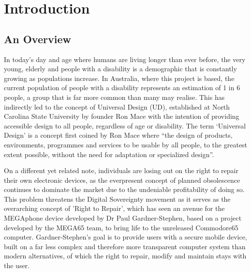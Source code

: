 
\chapter{Introduction}\label{chapter:firstchapter} %

\label{Chapter1} %


\section{An Overview}\label{sec:firstsection} %

In today's day and age where humans are living longer than ever before, the very young, elderly and people with a disability is a demographic that is constantly growing as populations increase.
In Australia, where this project is based, the current population of people with a disability represents an estimation of 1 in 6 people\cite{ausstats}, a group that is far more common than many may realise.
This has indirectly led to the concept of Universal Design (UD), established at North Carolina State University by founder Ron Mace with the intention of providing accessible design to all people, regardless of age or disability\cite{ronald}.
The term ‘Universal Design’ is a concept first coined by Ron Mace where “the design of products, environments, programmes and services to be usable by all people, to the greatest extent possible, without the need for adaptation or specialized design”\cite{nda}. 

On a different yet related note, individuals are losing out on the right to repair their own electronic devices, as the everpresent concept of planned obsolescence continues to dominate the market due to the undeniable profitability of doing so\cite{obsolescence2}.
This problem threatens the Digital Sovereignty movement as it serves as the overarching concept of 'Right to Repair', which has seen an avenue for the MEGAphone device developed by Dr Paul Gardner-Stephen\cite{mobilehistory}, based on a project developed by the MEGA65 team\cite{mega65}, to bring life to the unreleased Commodore65 computer. %
Gardner-Stephen's goal is to provide users with a secure mobile device, built on a far less complex and therefore more transparent computer system than modern alternatives, of which the right to repair, modify and maintain stays with the user.

